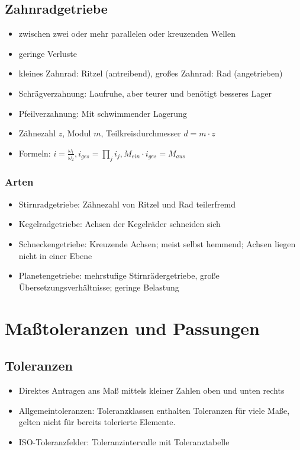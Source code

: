 \documentclass[a4paper,parskip=half*,DIV=7,fontsize=11pt]{scrartcl}
\begin{document}
\subsection{Zahnradgetriebe}
\begin{itemize}
	\item zwischen zwei oder mehr parallelen oder kreuzenden Wellen
	\item geringe Verluste
	\item kleines Zahnrad: Ritzel (antreibend), großes Zahnrad: Rad (angetrieben)
	\item Schrägverzahnung: Laufruhe, aber teurer und benötigt besseres Lager
	\item Pfeilverzahnung: Mit schwimmender Lagerung
	\item Zähnezahl $z$, Modul $m$, Teilkreisdurchmesser $d= m \cdot z$
	\item Formeln: $i=\frac{\omega_1}{\omega_2}, i_{ges}=\prod_{j}{} i_j, M_{ein} \cdot i_{ges}=M_{aus}$
\end{itemize}
	
\subsubsection{Arten}
\begin{itemize}
	\item Stirnradgetriebe: Zähnezahl von Ritzel und Rad teilerfremd
	\item Kegelradgetriebe: Achsen der Kegelräder schneiden sich
	\item 	Schneckengetriebe: Kreuzende Achsen; meist selbst hemmend; Achsen liegen nicht in einer Ebene
	\item 	Planetengetriebe: mehrstufige Stirnrädergetriebe, große Übersetzungsverhältnisse; geringe Belastung
\end{itemize}	
	
\section{Maßtoleranzen und Passungen}
\subsection{Toleranzen}
\begin{itemize}
	\item Direktes Antragen ans Maß mittels kleiner Zahlen oben und unten rechts
	\item Allgemeintoleranzen: Toleranzklassen enthalten Toleranzen für viele Maße, gelten nicht für bereits tolerierte Elemente.
	\item ISO-Toleranzfelder: Toleranzintervalle mit Toleranztabelle
\end{itemize}
	
\end{document}
